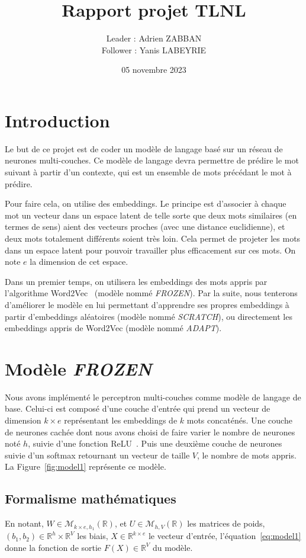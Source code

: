 \documentclass[a4paper]{article}
\title{Rapport projet TLNL}
\author{Leader : Adrien ZABBAN \\ Follower : Yanis LABEYRIE}
\date{05 novembre 2023}
\begin{document}
\maketitle


\section{Introduction}

Le but de ce projet est de coder un modèle de langage basé sur un réseau de neurones multi-couches. Ce modèle de langage devra permettre 
de prédire le mot suivant à partir d'un contexte, qui est un ensemble de mots précédant le mot à prédire. 

Pour faire cela, on utilise des embeddings. Le principe est d'associer à chaque mot un vecteur dans un espace latent de telle sorte que 
deux mots similaires (en termes de sens)  aient des vecteurs proches (avec une distance euclidienne), et deux mots totalement différents 
soient très loin. Cela permet de projeter les mots dans un espace latent pour pouvoir travailler plus efficacement sur ces mots. 
On note $e$ la dimension de cet espace.

Dans un premier temps, on utilisera les embeddings des mots appris par l'algorithme Word2Vec~\cite{mikolov2013efficient} 
(modèle nommé \textit{FROZEN}). Par la suite, nous tenterons d'améliorer le modèle en lui permettant d'apprendre ses propres 
embeddings à partir d'embeddings aléatoires (modèle nommé \textit{SCRATCH}), ou directement les embeddings appris de Word2Vec 
(modèle nommé \textit{ADAPT}).


\section{Modèle \textit{FROZEN}}

Nous avons implémenté le perceptron multi-couches comme modèle de langage de base. Celui-ci est composé d'une couche d'entrée qui 
prend un vecteur de dimension $k \times e$ représentant les embeddings de $k$ mots concaténés. Une couche de neurones cachée dont 
nous avons choisi de faire varier le nombre de neurones noté $h$, suivie d'une fonction ReLU~\cite{DBLP:journals/corr/abs-1803-08375}. 
Puis une deuxième couche de neurones suivie d'un softmax retournant un vecteur de taille $V$, le nombre de mots appris. 
La Figure~\ref{fig:model1} représente ce modèle.

\subsection{Formalisme mathématiques}
En notant, $W \in \mathcal{M}_{k \times e, h_1}(\mathbb{R})$, et $U \in \mathcal{M}_{h, V}(\mathbb{R})$ les matrices de poids, 
$(b_1,b_2) \in \mathbb{R}^{h} \times \mathbb{R}^{V}$ les biais, $X \in \mathbb{R}^{k \times e}$ le vecteur d'entrée, 
l'équation~\ref{eq:model1} donne la fonction de sortie $F(X) \in \mathbb{R}^{V}$ du modèle. 
\end{document}
